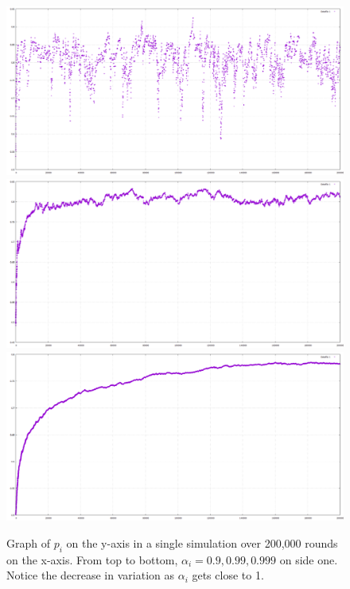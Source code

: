 \documentclass{article}
\begin{document}
\begin{figure}[htp]
\centering
\includegraphics[width=.8\textwidth]{images/ai9side1x200000}\hfill
\includegraphics[width=.8\textwidth]{images/ai99side1x200000}\hfill
\includegraphics[width=.8\textwidth]{images/ai999side1x200000}
\caption{Graph of $p_i$ on the y-axis in a single simulation over 200,000 rounds on the x-axis. From top to bottom, $\alpha_i = 0.9, 0.99, 0.999$ on side one.  Notice the decrease in variation as $\alpha_i$ gets close to 1.}
\label{fig:figure3}
\end{figure}
\end{document}
